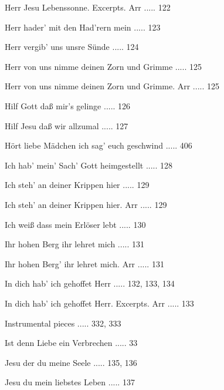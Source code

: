 \documentclass[twocolumn]{book}
\begin{document}
\newline 
Herr Jesu Lebenssonne. Excerpts. Arr ..... 122

\newline 
Herr hader' mit den Had'rern mein ..... 123

\newline 
Herr vergib' uns unsre Sünde ..... 124

\newline 
Herr von uns nimme deinen Zorn und Grimme ..... 125

\newline 
Herr von uns nimme deinen Zorn und Grimme. Arr ..... 125

\newline 
Hilf Gott daß mir's gelinge ..... 126

\newline 
Hilf Jesu daß wir allzumal ..... 127

\newline 
Hört liebe Mädchen ich sag' euch geschwind ..... 406

\newline 
Ich hab' mein' Sach' Gott heimgestellt ..... 128

\newline 
Ich steh' an deiner Krippen hier ..... 129

\newline 
Ich steh' an deiner Krippen hier. Arr ..... 129

\newline 
Ich weiß dass mein Erlöser lebt ..... 130

\newline 
Ihr hohen Berg ihr lehret mich ..... 131

\newline 
Ihr hohen Berg' ihr lehret mich. Arr ..... 131

\newline 
In dich hab' ich gehoffet Herr ..... 132, 133, 134

\newline 
In dich hab' ich gehoffet Herr. Excerpts. Arr ..... 133

\newline 
Instrumental pieces ..... 332, 333

\newline 
Ist denn Liebe ein Verbrechen ..... 33

\newline 
Jesu der du meine Seele ..... 135, 136

\newline 
Jesu du mein liebstes Leben ..... 137
\end{document}
